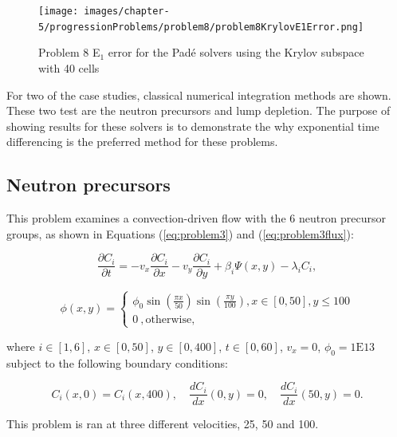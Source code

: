 \clearpage

\begin{figure}[p]
    \centering
    \texttt{[image: images/chapter-5/progressionProblems/problem8/problem8KrylovE1Error.png]}
    \caption{Problem 8 E${}_{1}$ error for the Pad\'e solvers using the Krylov subspace with 40 cells}
    \label{fig:problem8_E1_error_krylov}
\end{figure}

\clearpage

For two of the case studies, classical numerical integration methods are shown. These two test are the neutron precursors and lump depletion. The purpose of showing results for these solvers is to demonstrate the why exponential time differencing is the preferred method for these problems.  

\subsection{Neutron precursors}
This problem examines a convection-driven flow with the 6 neutron precursor groups, as shown in Equations (\ref{eq:problem3}) and (\ref{eq:problem3flux}): 

\begin{equation}
\frac{\partial C_{i}}{\partial t} = -v_{x}\frac{\partial C_{i}}{\partial x} - v_{y}\frac{\partial C_{i}}{\partial y} + \beta_{i} \Psi (x, y) -\lambda_i C_{i},
\label{eq:problem3}
\end{equation}

\begin{equation}
\phi (x, y) = \begin{cases}
  \phi _0 \sin\left(\frac{\pi x}{50}\right)\sin\left(\frac{\pi y}{100}\right) , x \in [0,50], y \le 100 \\
  0\ , \text{otherwise},
  \label{eq:problem3flux}
\end{cases}
\end{equation}

\noindent where $i \in [1,6]$, $x \in [0, 50]$, $y \in [0, 400]$, $t \in [0, 60]$, $v_{x} = 0$, $\phi_0 = 1\text{E}13$ subject to the following boundary conditions:

\begin{equation}
    C_{i}(x,0) = C_{i}(x,400), \quad \frac{dC_{i}}{dx}(0,y) = 0, \quad \frac{dC_{i}}{dx}(50, y) = 0.
\end{equation}

\noindent This problem is ran at three different velocities, 25, 50 and 100. 

